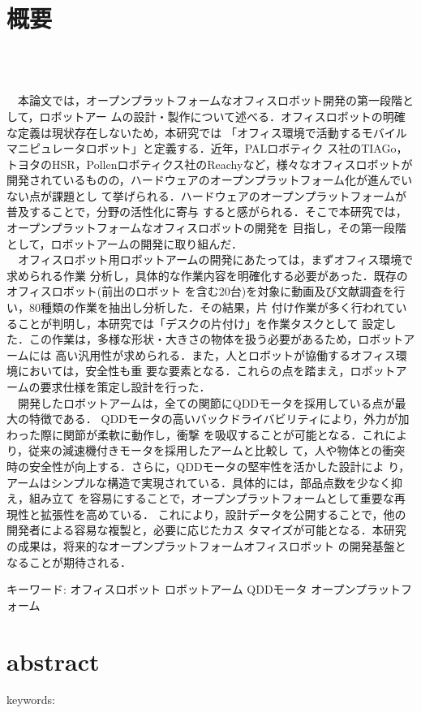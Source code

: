 \chapter*{概要}
\thispagestyle{empty}
%
\begin{center}
  \scalebox{1.5}{オープンプラットフォームオフィスロボットの開発}\\
  \scalebox{1.2}{-QDDモータを使用したロボットアームの設計と製作-}\\
\end{center}
\vspace{1.0zh}
%
　本論文では，オープンプラットフォームなオフィスロボット開発の第一段階として，ロボットアー
ムの設計・製作について述べる．オフィスロボットの明確な定義は現状存在しないため，本研究では
「オフィス環境で活動するモバイルマニピュレータロボット」と定義する．近年，PALロボティク
ス社のTIAGo，トヨタのHSR，Pollenロボティクス社のReachyなど，様々なオフィスロボットが
開発されているものの，ハードウェアのオープンプラットフォーム化が進んでいない点が課題とし
て挙げられる．ハードウェアのオープンプラットフォームが普及することで，分野の活性化に寄与
すると感がられる．そこで本研究では，オープンプラットフォームなオフィスロボットの開発を
目指し，その第一段階として，ロボットアームの開発に取り組んだ．\\
　オフィスロボット用ロボットアームの開発にあたっては，まずオフィス環境で求められる作業
分析し，具体的な作業内容を明確化する必要があった．既存のオフィスロボット(前出のロボット
を含む20台)を対象に動画及び文献調査を行い，80種類の作業を抽出し分析した．その結果，片
付け作業が多く行われていることが判明し，本研究では「デスクの片付け」を作業タスクとして
設定した．この作業は，多様な形状・大きさの物体を扱う必要があるため，ロボットアームには
高い汎用性が求められる．また，人とロボットが協働するオフィス環境においては，安全性も重
要な要素となる．これらの点を踏まえ，ロボットアームの要求仕様を策定し設計を行った．\\
　開発したロボットアームは，全ての関節にQDDモータを採用している点が最大の特徴である．
QDDモータの高いバックドライバビリティにより，外力が加わった際に関節が柔軟に動作し，衝撃
を吸収することが可能となる．これにより，従来の減速機付きモータを採用したアームと比較し
て，人や物体との衝突時の安全性が向上する．さらに，QDDモータの堅牢性を活かした設計によ
り，アームはシンプルな構造で実現されている．具体的には，部品点数を少なく抑え，組み立て
を容易にすることで，オープンプラットフォームとして重要な再現性と拡張性を高めている．
これにより，設計データを公開することで，他の開発者による容易な複製と，必要に応じたカス
タマイズが可能となる．本研究の成果は，将来的なオープンプラットフォームオフィスロボット
の開発基盤となることが期待される．

キーワード: オフィスロボット ロボットアーム QDDモータ オープンプラットフォーム
%
\newpage
\chapter*{abstract}
\thispagestyle{empty}
%
\begin{center}
  \scalebox{1.3}{title}
\end{center}
\vspace{1.0zh}
%


keywords: 
